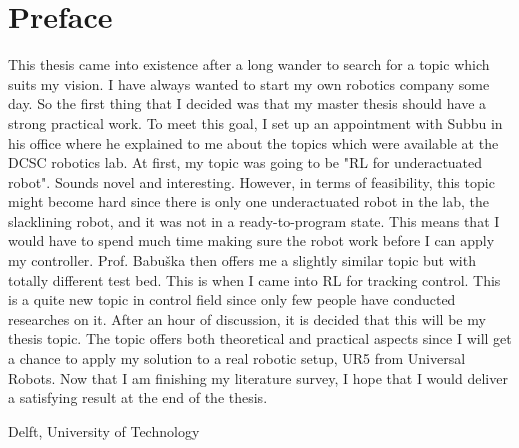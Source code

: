 %
\chapter{Preface}
This thesis came into existence after a long wander to search for a topic which suits my vision. I have always wanted to start my own robotics company some day. So the first thing that I decided was that my master thesis should have a strong practical work. To meet this goal, I set up an appointment with Subbu in his office where he explained to me about the topics which were available at the \ac {DCSC} robotics lab. At first, my topic was going to be "\ac {RL} for underactuated robot". Sounds novel and interesting. However, in terms of feasibility, this topic might become hard since there is only one underactuated robot in the lab, the slacklining robot, and it was not in a ready-to-program state. This means that I would have to spend much time making sure the robot work before I can apply my controller. Prof. Babu\v{s}ka then offers me a slightly similar topic but with totally different test bed. This is when I came into \ac {RL} for tracking control. This is a quite new topic in control field since only few people have conducted researches on it. After an hour of discussion, it is decided that this will be my thesis topic. The topic offers both theoretical and practical aspects since I will get a chance to apply my solution to a real robotic setup, UR5 from Universal Robots. Now that I am finishing my literature survey, I hope that I would deliver a satisfying result at the end of the thesis.

\vspace{30mm}
Delft, University of Technology \hfill \mscname \\
\mscdate